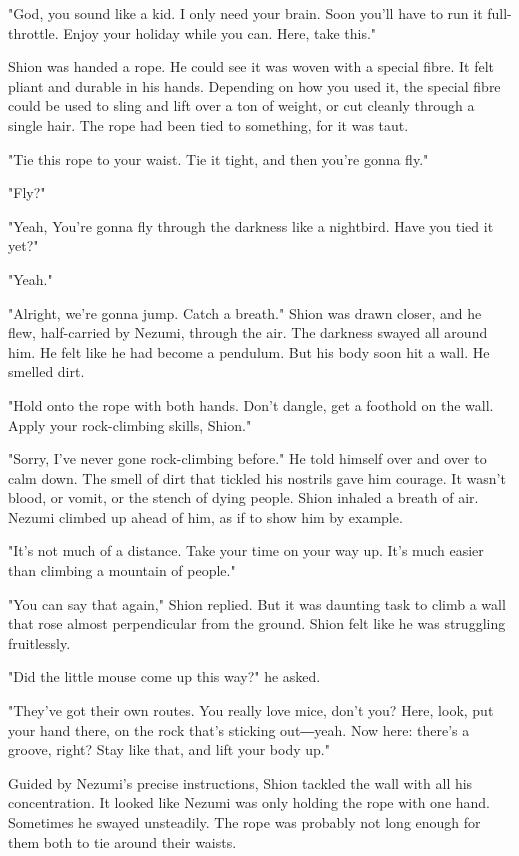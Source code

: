 "God, you sound like a kid. I only need your brain. Soon you'll have to
run it full-throttle. Enjoy your holiday while you can. Here, take
this."

Shion was handed a rope. He could see it was woven with a special fibre.
It felt pliant and durable in his hands. Depending on how you used it,
the special fibre could be used to sling and lift over a ton of weight,
or cut cleanly through a single hair. The rope had been tied to
something, for it was taut.

"Tie this rope to your waist. Tie it tight, and then you're gonna fly."

"Fly?"

"Yeah, You're gonna fly through the darkness like a nightbird. Have you
tied it yet?"

"Yeah."

"Alright, we're gonna jump. Catch a breath." Shion was drawn closer, and
he flew, half-carried by Nezumi, through the air. The darkness swayed
all around him. He felt like he had become a pendulum. But his body soon
hit a wall. He smelled dirt.

"Hold onto the rope with both hands. Don't dangle, get a foothold on the
wall. Apply your rock-climbing skills, Shion."

"Sorry, I've never gone rock-climbing before." He told himself over and
over to calm down. The smell of dirt that tickled his nostrils gave him
courage. It wasn't blood, or vomit, or the stench of dying people. Shion
inhaled a breath of air. Nezumi climbed up ahead of him, as if to show
him by example.

"It's not much of a distance. Take your time on your way up. It's much
easier than climbing a mountain of people."

"You can say that again," Shion replied. But it was daunting task to
climb a wall that rose almost perpendicular from the ground. Shion felt
like he was struggling fruitlessly.

"Did the little mouse come up this way?" he asked.

"They've got their own routes. You really love mice, don't you? Here,
look, put your hand there, on the rock that's sticking out―yeah. Now
here: there's a groove, right? Stay like that, and lift your body up."

Guided by Nezumi's precise instructions, Shion tackled the wall with all
his concentration. It looked like Nezumi was only holding the rope with
one hand. Sometimes he swayed unsteadily. The rope was probably not long
enough for them both to tie around their waists.

